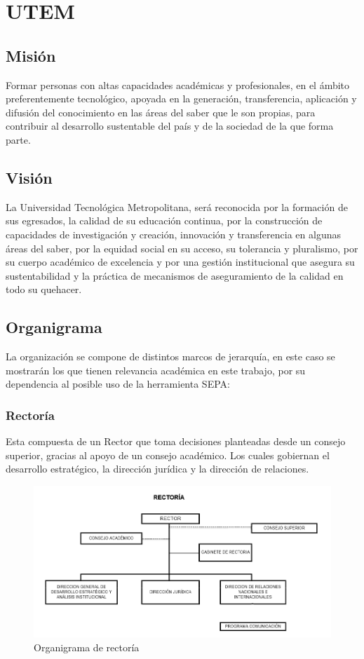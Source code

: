 \documentclass[a4paper,12pt,openany,oneside]{book}
\begin{document}
\chapter{UTEM}
\thispagestyle{empty}
\section{Misión}
Formar personas con altas capacidades académicas y profesionales, en el ámbito preferentemente tecnológico, apoyada en la generación, transferencia, aplicación y difusión del conocimiento en las áreas del saber que le son propias, para contribuir al desarrollo sustentable del país y de la sociedad de la que forma parte.
\section{Visión}
La Universidad Tecnológica Metropolitana, será reconocida por la formación de sus egresados, la calidad de su educación continua, por la construcción de capacidades de investigación y creación, innovación y transferencia en algunas áreas del saber, por la equidad social en su acceso, su tolerancia y pluralismo, por su cuerpo académico de excelencia y por una gestión institucional que asegura su sustentabilidad y la práctica de mecanismos de aseguramiento de la calidad en todo su quehacer.
\section{Organigrama}
La organización se compone de distintos marcos de jerarquía, en este caso se mostrarán los que tienen relevancia académica en este trabajo, por su dependencia al posible uso de la herramienta SEPA:
\subsection{Rectoría}
Esta compuesta de un Rector que toma decisiones planteadas desde un consejo superior, gracias al apoyo de un consejo académico. Los cuales gobiernan el desarrollo estratégico, la dirección jurídica y la dirección de relaciones.
\begin{figure}[!hbp]
\begin{center}
\includegraphics[scale=0.6,angle=0]{images/organigrama/1.png}
\caption{Organigrama de rector\'ia}
\label{Organigrama de rectoria}
\end{center}
\end{figure}
\end{document}
